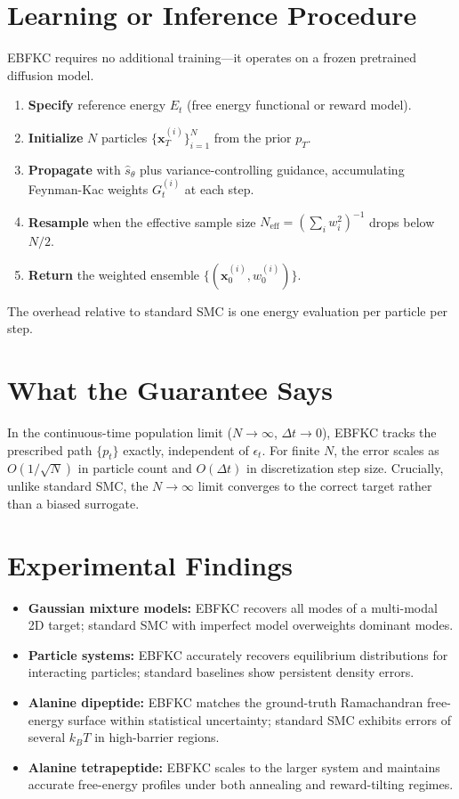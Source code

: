 \documentclass[10pt,twocolumn]{article}
\begin{document}
\section{Learning or Inference Procedure}

EBFKC requires no additional training---it operates on a frozen pretrained diffusion model.

\begin{enumerate}[itemsep=2pt,parsep=0pt]
  \item \textbf{Specify} reference energy $E_t$ (free energy functional or reward model).
  \item \textbf{Initialize} $N$ particles $\{\mathbf{x}_T^{(i)}\}_{i=1}^N$ from the
    prior $p_T$.
  \item \textbf{Propagate} with $\hat{s}_\theta$ plus variance-controlling guidance,
    accumulating Feynman-Kac weights $G_t^{(i)}$ at each step.
  \item \textbf{Resample} when the effective sample size
    $N_{\text{eff}} = (\sum_i w_i^2)^{-1}$ drops below $N/2$.
  \item \textbf{Return} the weighted ensemble $\{(\mathbf{x}_0^{(i)}, w_0^{(i)})\}$.
\end{enumerate}

The overhead relative to standard SMC is one energy evaluation per particle per step.

\section{What the Guarantee Says}

In the continuous-time population limit ($N \to \infty$, $\Delta t \to 0$), EBFKC
tracks the prescribed path $\{p_t\}$ exactly, independent of $\epsilon_t$.
For finite $N$, the error scales as $O(1/\sqrt{N})$ in particle count and
$O(\Delta t)$ in discretization step size. Crucially, unlike standard SMC,
the $N \to \infty$ limit converges to the correct target rather than a biased surrogate.

\section{Experimental Findings}

\begin{itemize}[itemsep=2pt,parsep=0pt]
  \item \textbf{Gaussian mixture models:} EBFKC recovers all modes of a multi-modal
    2D target; standard SMC with imperfect model overweights dominant modes.
  \item \textbf{Particle systems:} EBFKC accurately recovers equilibrium distributions
    for interacting particles; standard baselines show persistent density errors.
  \item \textbf{Alanine dipeptide:} EBFKC matches the ground-truth Ramachandran
    free-energy surface within statistical uncertainty; standard SMC exhibits errors
    of several $k_BT$ in high-barrier regions.
  \item \textbf{Alanine tetrapeptide:} EBFKC scales to the larger system and maintains
    accurate free-energy profiles under both annealing and reward-tilting regimes.
\end{itemize}
\end{document}
